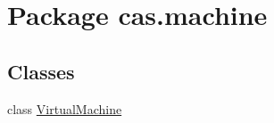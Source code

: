 \hypertarget{namespacecas_1_1machine}{\section{Package cas.\-machine}
\label{namespacecas_1_1machine}
}
\subsection*{Classes}
\begin{DoxyCompactItemize}
\item 
class \hyperlink{classcas_1_1machine_1_1_virtual_machine}{Virtual\-Machine}
\end{DoxyCompactItemize}
